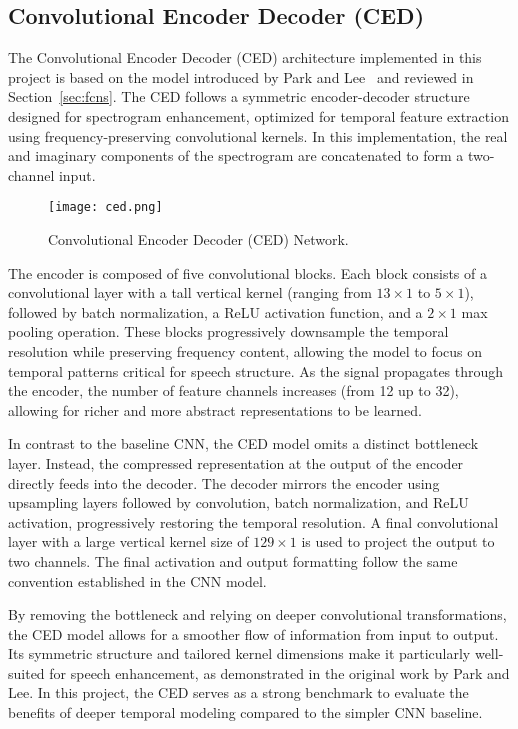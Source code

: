 \subsection{Convolutional Encoder Decoder (CED)}
\label{sec:ced}

The Convolutional Encoder Decoder (CED) architecture implemented in this project is based on the model introduced by Park and Lee~\cite{park2017acoustic} and reviewed in Section~\ref{sec:fcns}. The CED follows a symmetric encoder-decoder structure designed for spectrogram enhancement, optimized for temporal feature extraction using frequency-preserving convolutional kernels. In this implementation, the real and imaginary components of the spectrogram are concatenated to form a two-channel input.


\begin{figure}[h]
    \centering
    \texttt{[image: ced.png]}
    \caption{\label{fig:ced}Convolutional Encoder Decoder (CED) Network\cite{park2017acoustic}.}
\end{figure}

The encoder is composed of five convolutional blocks. Each block consists of a convolutional layer with a tall vertical kernel (ranging from \(13 \times 1\) to \(5 \times 1\)), followed by batch normalization, a ReLU activation function, and a \(2 \times 1\) max pooling operation. These blocks progressively downsample the temporal resolution while preserving frequency content, allowing the model to focus on temporal patterns critical for speech structure. As the signal propagates through the encoder, the number of feature channels increases (from 12 up to 32), allowing for richer and more abstract representations to be learned.

In contrast to the baseline CNN, the CED model omits a distinct bottleneck layer. Instead, the compressed representation at the output of the encoder directly feeds into the decoder. The decoder mirrors the encoder using upsampling layers followed by convolution, batch normalization, and ReLU activation, progressively restoring the temporal resolution. A final convolutional layer with a large vertical kernel size of \(129 \times 1\) is used to project the output to two channels. The final activation and output formatting follow the same convention established in the CNN model.

By removing the bottleneck and relying on deeper convolutional transformations, the CED model allows for a smoother flow of information from input to output. Its symmetric structure and tailored kernel dimensions make it particularly well-suited for speech enhancement, as demonstrated in the original work by Park and Lee. In this project, the CED serves as a strong benchmark to evaluate the benefits of deeper temporal modeling compared to the simpler CNN baseline.

